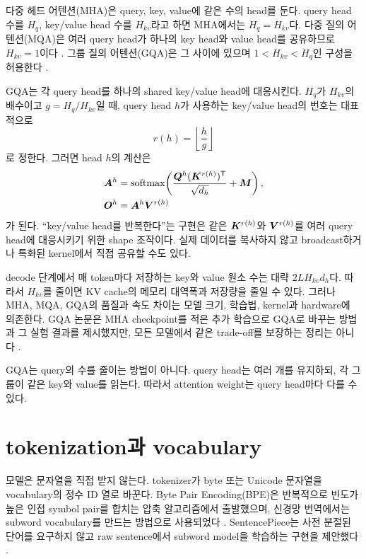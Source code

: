 다중 헤드 어텐션(MHA)은 query, key, value에 같은 수의 head를 둔다.
query head 수를 $H_q$, key/value head 수를 $H_{kv}$라고 하면 MHA에서는 $H_q=H_{kv}$다.
다중 질의 어텐션(MQA)은 여러 query head가 하나의 key head와 value head를 공유하므로 $H_{kv}=1$이다 \citep{shazeer2019mqa}.
그룹 질의 어텐션(GQA)은 그 사이에 있으며 $1<H_{kv}<H_q$인 구성을 허용한다 \citep{ainslie2023gqa}.

GQA는 각 query head를 하나의 shared key/value head에 대응시킨다.
$H_q$가 $H_{kv}$의 배수이고 $g=H_q/H_{kv}$일 때, query head $h$가 사용하는 key/value head의 번호는 대표적으로
\begin{equation}
  r(h)=\left\lfloor\frac{h}{g}\right\rfloor
\end{equation}
로 정한다.
그러면 head $h$의 계산은
\begin{align}
  \bm{A}^{h}&=\operatorname{softmax}\!\left(
  \frac{\bm{Q}^{h}(\bm{K}^{r(h)})^{\mathsf T}}{\sqrt{d_h}}+\bm{M}
  \right),\\
  \bm{O}^{h}&=\bm{A}^{h}\bm{V}^{r(h)}
\end{align}
가 된다.
``key/value head를 반복한다''는 구현은 같은 $\bm{K}^{r(h)}$와 $\bm{V}^{r(h)}$를 여러 query head에 대응시키기 위한 shape 조작이다.
실제 데이터를 복사하지 않고 broadcast하거나 특화된 kernel에서 직접 공유할 수도 있다.

decode 단계에서 매 token마다 저장하는 key와 value 원소 수는 대략 $2LH_{kv}d_h$다.
따라서 $H_{kv}$를 줄이면 KV cache의 메모리 대역폭과 저장량을 줄일 수 있다.
그러나 MHA, MQA, GQA의 품질과 속도 차이는 모델 크기, 학습법, kernel과 hardware에 의존한다.
GQA 논문은 MHA checkpoint를 적은 추가 학습으로 GQA로 바꾸는 방법과 그 실험 결과를 제시했지만, 모든 모델에서 같은 trade-off를 보장하는 정리는 아니다 \citep{ainslie2023gqa}.

\begin{factbox}
GQA는 query의 수를 줄이는 방법이 아니다.
query head는 여러 개를 유지하되, 각 그룹이 같은 key와 value를 읽는다.
따라서 attention weight는 query head마다 다를 수 있다.
\end{factbox}

\section{tokenization과 vocabulary}

모델은 문자열을 직접 받지 않는다.
tokenizer가 byte 또는 Unicode 문자열을 vocabulary의 정수 ID 열로 바꾼다.
Byte Pair Encoding(BPE)은 반복적으로 빈도가 높은 인접 symbol pair를 합치는 압축 알고리즘에서 출발했으며, 신경망 번역에서는 subword vocabulary를 만드는 방법으로 사용되었다 \citep{sennrich2016bpe}.
SentencePiece는 사전 분절된 단어를 요구하지 않고 raw sentence에서 subword model을 학습하는 구현을 제안했다 \citep{kudo2018sentencepiece}.

